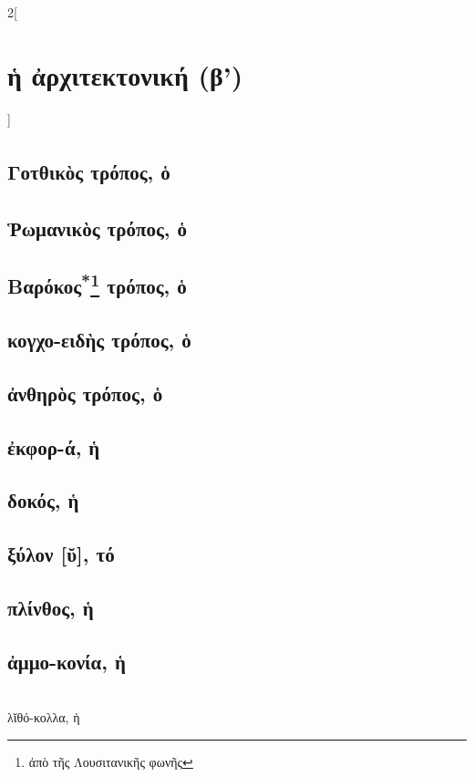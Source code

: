 \documentclass{book}
\begin{document}
\begin{multicols}{2}[\section{ἡ ἀρχιτεκτονική (β')}]
\subsection{Γοτθικὸς\textsuperscript{\textdagger} τρόπος, ὁ}
\subsection{Ῥωμανικὸς\textsuperscript{\textdagger} τρόπος, ὁ}
\subsection{Βαρόκος\textsuperscript{*}\protect\footnote{ἀπὸ τῆς Λουσιτανικῆς φωνῆς} τρόπος, ὁ}
\subsection{κογχο-ειδὴς τρόπος, ὁ}
\subsection{ἀνθηρὸς τρόπος, ὁ}
\subsection{ἐκφορ-ά, ἡ}         
\subsection{δοκός, ἡ}
\subsection{ξύλον [ῠ], τό}
\subsection{πλίνθος, ἡ}
\subsection{ἀμμο-κονία, ἡ}
 ~\\
λῐθό-κολλα, ἡ

\end{multicols}
\end{document}
